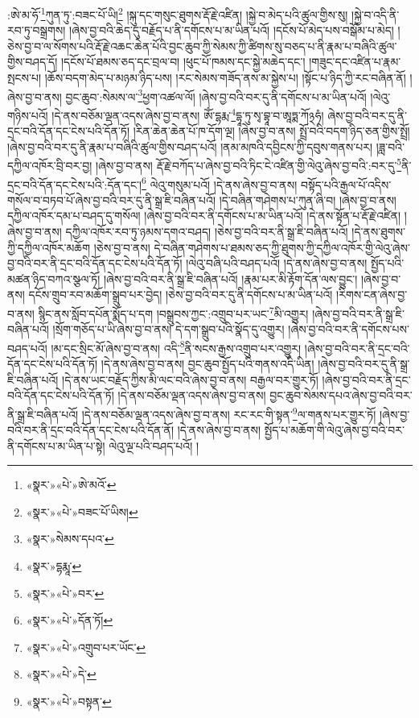 :ཨེ་མ་ཧོ་\footnote{«སྣར་»«པེ་»ཨེ་མའོ་}ཀུན་ཏུ་:བཟང་པོ་ཡི།\footnote{«སྣར་»«པེ་»བཟང་པོ་ཡིས།} །སྐུ་དང་གསུང་ཐུགས་རྡོ་རྗེ་འཛིན། །སྐྱེ་བ་མེད་པའི་ཚུལ་གྱིས་སུ། །སྐྱེ་བ་འདི་ནི་རབ་ཏུ་བསྒྲགས། །ཞེས་བྱ་བའི་ཆེད་དུ་བརྗོད་པ་ནི་དགོངས་པ་མ་ཡིན་པའོ། །དངོས་པོ་མེད་པས་བསྒོམ་པ་མེད། །ཅེས་བྱ་བ་ལ་སོགས་པའི་རྡོ་རྗེ་འཆང་ཆེན་པོའི་བྱང་ཆུབ་ཀྱི་སེམས་ཀྱི་ཚིགས་སུ་བཅད་པ་ནི་རྣམ་པ་བཞིའི་ཚུལ་གྱིས་བཤད་དོ། །དངོས་པོ་ཐམས་ཅད་དང་བྲལ་བ། །ཕུང་པོ་ཁམས་དང་སྐྱེ་མཆེད་དང་། །གཟུང་དང་འཛིན་པ་རྣམ་སྤངས་པ། །ཆོས་བདག་མེད་པ་མཉམ་ཉིད་པས། །རང་སེམས་གཟོད་ནས་མ་སྐྱེས་པ། །སྟོང་པ་ཉིད་ཀྱི་རང་བཞིན་ནོ། །ཞེས་བྱ་བ་ནས། བྱང་ཆུབ་:སེམས་ལ་\footnote{«སྣར་»སེམས་དཔའ་}ཕྱག་འཚལ་ལོ། །ཞེས་བྱ་བའི་བར་དུ་ནི་དགོངས་པ་མ་ཡིན་པའོ། །ལེའུ་གཉིས་པའོ། །དེ་ནས་བཅོམ་ལྡན་འདས་ཞེས་བྱ་བ་ནས། ཨོཾ་དྷརྨ་\footnote{«སྣར་»དྷརྨཱ་}དྷཱ་ཏུ་སྭ་བྷཱ་བ་ཨཱཏྨ་ཀོ྅ཧཾ། ཞེས་བྱ་བའི་བར་དུ་ནི་དྲང་བའི་དོན་དང་ངེས་པའི་དོན་ཏོ། །རིན་ཆེན་ཆེན་པོ་ཁ་དོག་ལྔ། །ཞེས་བྱ་བ་ནས། སྤྲོ་བའི་བདག་ཉིད་ཅན་གྱིས་སྤྲོ། །ཞེས་བྱ་བའི་བར་དུ་ནི་རྣམ་པ་བཞིའི་ཚུལ་གྱིས་བཤད་པའོ། །ནམ་མཁའི་དབྱིངས་ཀྱི་དབུས་གནས་པར། །ཟླ་བའི་དཀྱིལ་འཁོར་བྲི་བར་བྱ། །ཞེས་བྱ་བ་ནས། རྡོ་རྗེ་བཀོད་པ་ཞེས་བྱ་བའི་ཏིང་ངེ་འཛིན་གྱི་ལེའུ་ཞེས་བྱ་བའི་:བར་དུ་\footnote{«སྣར་»«པེ་»བར་}ནི་དྲང་བའི་དོན་དང་ངེས་པའི་:དོན་དང་།\footnote{«སྣར་»«པེ་»དོན་ཏོ།} ལེའུ་གསུམ་པའོ། །དེ་ནས་ཞེས་བྱ་བ་ནས། བསྟོད་པའི་རྒྱལ་པོ་འདིས་གསོལ་བ་བཏབ་པོ་ཞེས་བྱ་བའི་བར་དུ་ནི་སྒྲ་ཇི་བཞིན་པའོ། །དེ་བཞིན་གཤེགས་པ་ཀུན་ཞི་བ། །ཞེས་བྱ་བ་ནས། དཀྱིལ་འཁོར་དམ་པ་བཤད་དུ་གསོལ། །ཞེས་བྱ་བའི་བར་ནི་དགོངས་པ་མ་ཡིན་པའོ། །དེ་ནས་སྟོན་པ་རྡོ་རྗེ་འཛིན། །ཞེས་བྱ་བ་ནས། དཀྱིལ་འཁོར་རབ་ཏུ་ཉམས་དགའ་བཤད། །ཅེས་བྱ་བའི་བར་ནི་སྒྲ་ཇི་བཞིན་པའོ། །དེ་ནས་ཐུགས་ཀྱི་དཀྱིལ་འཁོར་མཆོག །ཅེས་བྱ་བ་ནས། དེ་བཞིན་གཤེགས་པ་ཐམས་ཅད་ཀྱི་ཐུགས་ཀྱི་དཀྱིལ་འཁོར་གྱི་ལེའུ་ཞེས་བྱ་བའི་བར་ནི་དྲང་བའི་དོན་དང་ངེས་པའི་དོན་ཏོ། །ལེའུ་བཞི་པའི་བཤད་པའོ། །དེ་ནས་ཞེས་བྱ་བ་ནས། སྤྱོད་པའི་མཚན་ཉིད་བཀའ་སྩལ་ཏོ། །ཞེས་བྱ་བའི་བར་ནི་སྒྲ་ཇི་བཞིན་པའོ། །རྣམ་པར་མི་རྟོག་དོན་ལས་བྱུང་། །ཞེས་བྱ་བ་ནས། དངོས་གྲུབ་རབ་མཆོག་སྒྲུབ་པར་བྱེད། །ཅེས་བྱ་བའི་བར་དུ་ནི་དགོངས་པ་མ་ཡིན་པའོ། །རིགས་ངན་ཞེས་བྱ་བ་ནས། སྙིང་ནས་སློབ་དཔོན་སྨོད་པ་དག །བསྒྲུབས་ཀྱང་:འགྲུབ་པར་ཡང་\footnote{«སྣར་»«པེ་»འགྲུབ་པར་ཡོང་}མི་འགྱུར། །ཞེས་བྱ་བའི་བར་ནི་སྒྲ་ཇི་བཞིན་པའོ། །སྲོག་གཅོད་པ་ཡི་ཞེས་བྱ་བ་ནས། དེ་དག་སྒྲུབ་པའི་སྣོད་དུ་འགྱུར། །ཞེས་བྱ་བའི་བར་ནི་དགོངས་པས་བཤད་པའོ། །མ་དང་སྲིང་མོ་ཞེས་བྱ་བ་ནས། འདི་\footnote{«སྣར་»«པེ་»དེ་}ནི་སངས་རྒྱས་འགྲུབ་པར་འགྱུར། །ཞེས་བྱ་བའི་བར་ནི་དྲང་བའི་དོན་དང་ངེས་པའི་དོན་ཏོ། །དེ་ནས་ཞེས་བྱ་བ་ནས། བྱང་ཆུབ་སྤྱོད་པའི་གནས་འདི་ཡིན། །ཞེས་བྱ་བའི་བར་དུ་ནི་སྒྲ་ཇི་བཞིན་པའོ། །དེ་ནས་ཡང་བརྗོད་ཀྱིས་མི་ལང་བའི་ཞེས་བྱ་བ་ནས། བརྒྱལ་བར་གྱུར་ཏོ། །ཞེས་བྱ་བའི་བར་ནི་དྲང་བའི་དོན་དང་ངེས་པའི་དོན་ཏོ། །དེ་ནས་བཅོམ་ལྡན་འདས་ཞེས་བྱ་བ་ནས། བྱང་ཆུབ་སེམས་དཔའ་ཞེས་བྱ་བའི་བར་ནི་སྒྲ་ཇི་བཞིན་པའོ། །དེ་ནས་བཅོམ་ལྡན་འདས་ཞེས་བྱ་བ་ནས། རང་རང་གི་སྟན་\footnote{«སྣར་»«པེ་»བསྟན་}ལ་གནས་པར་གྱུར་ཏོ། །ཞེས་བྱ་བའི་བར་ནི་དྲང་བའི་དོན་དང་ངེས་པའི་དོན་ནོ། །དེ་ནས་ཞེས་བྱ་བ་ནས། སྤྱོད་པ་མཆོག་གི་ལེའུ་ཞེས་བྱ་བའི་བར་ནི་དགོངས་པ་མ་ཡིན་པ་སྟེ། ལེའུ་ལྔ་པའི་བཤད་པའོ། །
